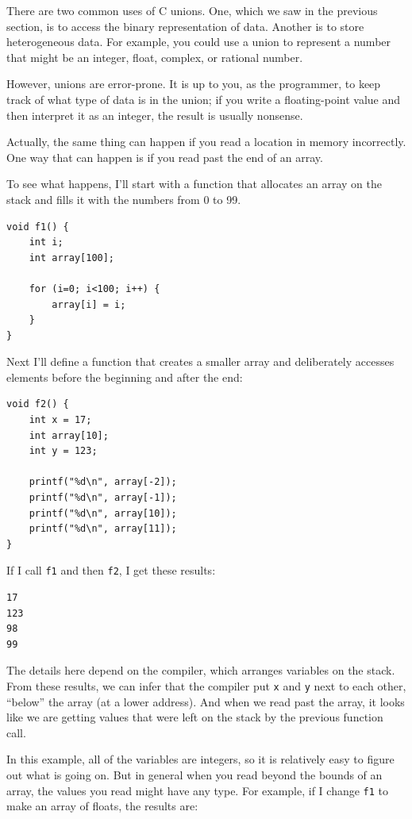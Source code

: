 \documentclass[12pt]{book}
\begin{document}
{There are two common uses of C unions.  One, which we saw in the
previous section, is to access the binary representation of data.
Another is to store heterogeneous data.  For example, you could
use a union to represent a number that might be an integer, float,
complex, or rational number.

However, unions are error-prone.  It is up to you, as the programmer,
to keep track of what type of data is in the union; if you write
a floating-point value and then interpret it as an integer, the result
is usually nonsense.

Actually, the same thing can happen if you read a location in memory
incorrectly.  One way that can happen is if you read past the end of
an array.

To see what happens, I'll start with a function that allocates an
array on the stack and fills it with the numbers from 0 to 99.

\begin{verbatim}
void f1() {
    int i;
    int array[100];

    for (i=0; i<100; i++) {
        array[i] = i;
    }
}
\end{verbatim}

Next I'll define a function that creates a smaller array and
deliberately accesses elements before the beginning and after
the end:

\begin{verbatim}
void f2() {
    int x = 17;
    int array[10];
    int y = 123;

    printf("%d\n", array[-2]);
    printf("%d\n", array[-1]);
    printf("%d\n", array[10]);
    printf("%d\n", array[11]);
}
\end{verbatim}

If I call {\tt f1} and then {\tt f2}, I get these results:

\begin{verbatim}
17
123
98
99
\end{verbatim}

The details here depend on the compiler, which arranges variables
on the stack.  From these results, we can infer that the
compiler put {\tt x} and {\tt y} next to each other, ``below''
the array (at a lower address).  And when we read past the
array, it looks like we are getting values that were left on
the stack by the previous function call.

In this example, all of the variables are integers, so it is
relatively easy to figure out what is going on.  But in general
when you read beyond the bounds of an array, the values you
read might have any type.  For example, if I change {\tt f1}
to make an array of floats, the results are:

}
\end{document}
